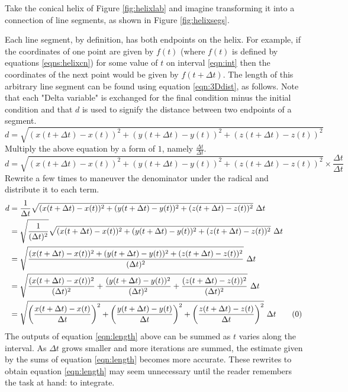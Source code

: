 \documentclass{article}
\begin{document}
Take the conical helix of Figure \ref{fig:helixlab} and imagine transforming it into a connection of line segments, as shown in Figure \ref{fig:helixsegs}.\par
Each line segment, by definition, has both endpoints on the helix. For example, if the coordinates of one point are given by $f(t)$ (where $f(t)$ is defined by equations \ref{eqns:helixcn}) for some value of $t$ on interval \ref{eqn:int} then the coordinates of the next point would be given by $f(t+\Delta t)$. The length of this arbitrary line segment can be found using equation \ref{eqn:3Ddist}, as follows. Note that each "Delta variable" is exchanged for the final condition minus the initial condition and that $d$ is used to signify the distance between two endpoints of a segment.
\begin{equation*}
    d = \sqrt{(x(t+\Delta t)-x(t))^2+(y(t+\Delta t)-y(t))^2+(z(t+\Delta t)-z(t))^2}
\end{equation*}
Multiply the above equation by a form of $1$, namely $\frac{\Delta t}{\Delta t}$.
\begin{equation*}
    d = \sqrt{(x(t+\Delta t)-x(t))^2+(y(t+\Delta t)-y(t))^2+(z(t+\Delta t)-z(t))^2}\times\frac{\Delta t}{\Delta t}
\end{equation*}
Rewrite a few times to maneuver the denominator under the radical and distribute it to each term.
\begin{align*}
    d &= \frac{1}{\Delta t}\sqrt{(x(t+\Delta t)-x(t))^2+(y(t+\Delta t)-y(t))^2+(z(t+\Delta t)-z(t))^2}\ \Delta t\\
    &= \sqrt{\frac{1}{(\Delta t)^2}}\sqrt{(x(t+\Delta t)-x(t))^2+(y(t+\Delta t)-y(t))^2+(z(t+\Delta t)-z(t))^2}\ \Delta t\\
    &= \sqrt{\frac{(x(t+\Delta t)-x(t))^2+(y(t+\Delta t)-y(t))^2+(z(t+\Delta t)-z(t))^2}{(\Delta t)^2}}\ \Delta t\\
    &= \sqrt{\frac{(x(t+\Delta t)-x(t))^2}{(\Delta t)^2}+\frac{(y(t+\Delta t)-y(t))^2}{(\Delta t)^2}+\frac{(z(t+\Delta t)-z(t))^2}{(\Delta t)^2}}\ \Delta t\\
    &= \sqrt{\left(\frac{x(t+\Delta t)-x(t)}{\Delta t}\right)^2+\left(\frac{y(t+\Delta t)-y(t)}{\Delta t}\right)^2+\left(\frac{z(t+\Delta t)-z(t)}{\Delta t}\right)^2}\ \Delta t\tag{\theequation}\label{eqn:length}
    \stepcounter{equation}
\end{align*}
The outputs of equation \ref{eqn:length} above can be summed as $t$ varies along the interval. As $\Delta t$ grows smaller and more iterations are summed, the estimate given by the sums of equation \ref{eqn:length} becomes more accurate. These rewrites to obtain equation \ref{eqn:length} may seem unnecessary until the reader remembers the task at hand: to integrate.\par
\end{document}
